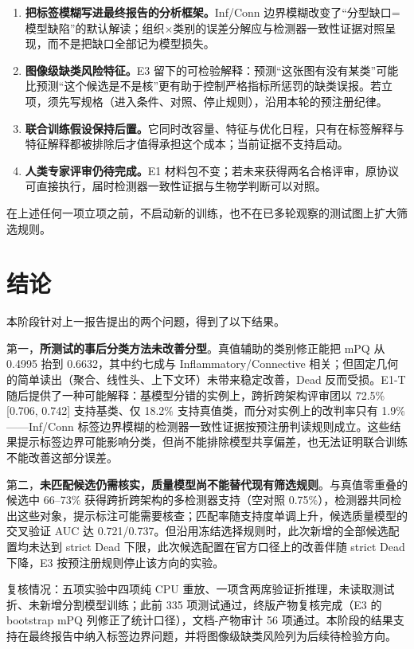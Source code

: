 \documentclass[11pt,a4paper,UTF8,fontset=fandol]{ctexart}
\begin{document}
\begin{enumerate}
\item \textbf{把标签模糊写进最终报告的分析框架。}Inf/Conn 边界模糊改变了“分型缺口=模型缺陷”的默认解读；组织$\times$类别的误差分解应与检测器一致性证据对照呈现，而不是把缺口全部记为模型损失。
\item \textbf{图像级缺类风险特征。}E3 留下的可检验解释：预测“这张图有没有某类”可能比预测“这个候选是不是核”更有助于控制严格指标所惩罚的缺类误报。若立项，须先写规格（进入条件、对照、停止规则），沿用本轮的预注册纪律。
\item \textbf{联合训练假设保持后置。}它同时改容量、特征与优化日程，只有在标签解释与特征解释都被排除后才值得承担这个成本；当前证据不支持启动。
\item \textbf{人类专家评审仍待完成。}E1 材料包不变；若未来获得两名合格评审，原协议可直接执行，届时检测器一致性证据与生物学判断可以对照。
\end{enumerate}

在上述任何一项立项之前，不启动新的训练，也不在已多轮观察的测试图上扩大筛选规则。

\section{结论}

本阶段针对上一报告提出的两个问题，得到了以下结果。

第一，\textbf{所测试的事后分类方法未改善分型}。真值辅助的类别修正能把 mPQ 从 0.4995 抬到 0.6632，其中约七成与 Inflammatory/Connective 相关；但固定几何的简单读出（聚合、线性头、上下文环）未带来稳定改善，Dead 反而受损。E1-T 随后提供了一种可能解释：基模型分错的实例上，跨折跨架构评审团以 72.5\% [0.706, 0.742] 支持基类、仅 18.2\% 支持真值类，而分对实例上的改判率只有 1.9\%——Inf/Conn 标签边界模糊的检测器一致性证据按预注册判读规则成立。这些结果提示标签边界可能影响分类，但尚不能排除模型共享偏差，也无法证明联合训练不能改善这部分误差。

第二，\textbf{未匹配候选仍需核实，质量模型尚不能替代现有筛选规则}。与真值零重叠的候选中 66--73\% 获得跨折跨架构的多检测器支持（空对照 0.75\%），检测器共同检出这些对象，提示标注可能需要核查；匹配率随支持度单调上升，候选质量模型的交叉验证 AUC 达 0.721/0.737。但沿用冻结选择规则时，此次新增的全部候选配置均未达到 strict Dead 下限，此次候选配置在官方口径上的改善伴随 strict Dead 下降，E3 按预注册规则停止该方向的实验。

复核情况：五项实验中四项纯 CPU 重放、一项含两席验证折推理，未读取测试折、未新增分割模型训练；此前 335 项测试通过，终版产物复核完成（E3 的 bootstrap mPQ 列修正了统计口径），文档-产物审计 56 项通过。本阶段的结果支持在最终报告中纳入标签边界问题，并将图像级缺类风险列为后续待检验方向。
\end{document}
